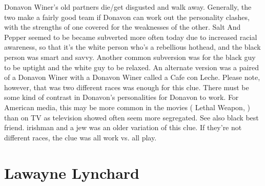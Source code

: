 \documentclass[12pt]{book}
\begin{document}
Donavon Winer's old partners die/get disgusted and walk away. Generally, the two make a fairly good team if Donavon can work out the personality clashes, with the strengths of one covered for the weaknesses of the other. Salt And Pepper seemed to be became subverted more often today due to increased racial awareness, so that it's the white person who's a rebellious hothead, and the black person was smart and savvy. Another common subversion was for the black guy to be uptight and the white guy to be relaxed. An alternate version was a paired of a Donavon Winer with a Donavon Winer called a Cafe con Leche. Please note, however, that was two different races was enough for this clue. There must be some kind of contrast in Donavon's personalities for Donavon to work. For American media, this may be more common in the movies ( Lethal Weapon,  ) than on TV as television showed often seem more segregated. See also black best friend. irishman and a jew was an older variation of this clue. If they're not different races, the clue was all work vs. all play.



\chapter{Lawayne Lynchard}
\end{document}
